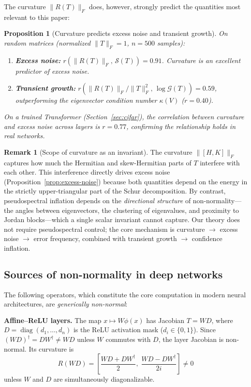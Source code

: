 \documentclass[11pt,a4paper]{article}
\newtheorem{proposition}[theorem]{Proposition}
\theoremstyle{definition}
\newtheorem{remark}[theorem]{Remark}
\DeclareMathOperator{\diag}{diag}
\begin{document}
The curvature $\|R(T)\|_F$ does, however, strongly predict the
quantities most relevant to this paper:

\begin{proposition}[Curvature predicts excess noise and transient growth]
\label{prop:curv-predictor}
On random matrices (normalized $\|T\|_F = 1$, $n = 500$ samples):
\begin{enumerate}[nosep]
  \item \textbf{Excess noise:}
        $r(\|R(T)\|_F,\, \mathcal{S}(T)) = 0.91$.
        Curvature is an excellent predictor of excess noise.
  \item \textbf{Transient growth:}
        $r(\|R(T)\|_F / \|T\|_F^2,\, \log\mathcal{G}(T)) = 0.59$,
        outperforming the eigenvector condition number
        $\kappa(V)$ ($r = 0.40$).
\end{enumerate}
On a trained Transformer (Section~\ref{sec:cifar}), the correlation
between curvature and excess noise across layers is $r = 0.77$,
confirming the relationship holds in real networks.
\end{proposition}

\begin{remark}[Scope of curvature as an invariant]
The curvature $\|[H,K]\|_F$ captures how much the Hermitian and
skew-Hermitian parts of $T$ interfere with each other. This
interference directly drives excess noise (Proposition~\ref{prop:excess-noise})
because both quantities depend on the energy in the strictly
upper-triangular part of the Schur decomposition. By contrast,
pseudospectral inflation depends on the \emph{directional structure}
of non-normality---the angles between eigenvectors, the clustering
of eigenvalues, and proximity to Jordan blocks---which a single
scalar invariant cannot capture. Our theory does not require
pseudospectral control; the core mechanism is
curvature $\to$ excess noise $\to$ error frequency, combined with
transient growth $\to$ confidence inflation.
\end{remark}

\subsection{Sources of non-normality in deep networks}

The following operators, which constitute the core computation in
modern neural architectures, are \emph{generically non-normal}:

\textbf{Affine--ReLU layers.}
The map $x \mapsto W\phi(x)$ has Jacobian $T = WD$, where
$D = \diag(d_1, \ldots, d_n)$ is the ReLU activation mask
($d_i \in \{0, 1\}$). Since $(WD)^\dagger = DW^\dagger \neq WD$
unless $W$ commutes with $D$, the layer Jacobian is non-normal.
Its curvature is
\[
  R(WD) = \left[\frac{WD + DW^\dagger}{2},\;
  \frac{WD - DW^\dagger}{2i}\right] \neq 0
\]
unless $W$ and $D$ are simultaneously diagonalizable.
\end{document}
